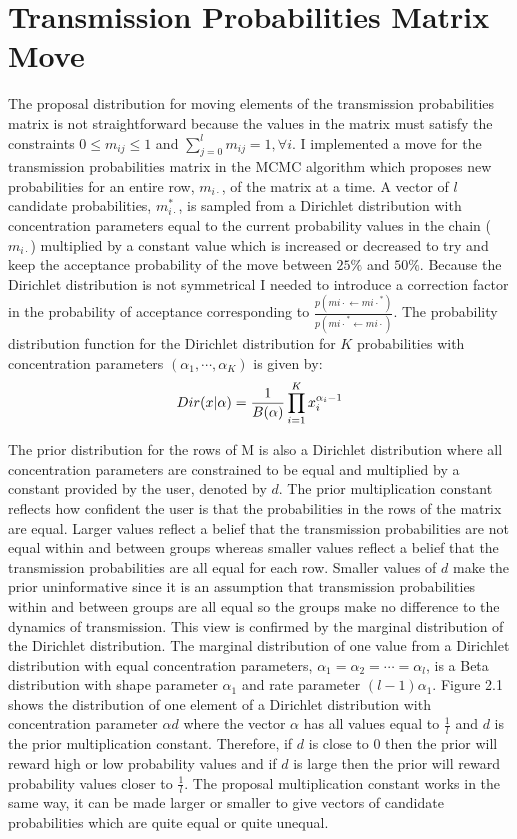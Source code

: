 \documentclass[11pt,a4paper]{report}
\begin{document}
\section{Transmission Probabilities Matrix Move}
The proposal distribution for moving elements of the transmission probabilities matrix is not straightforward because the values in the matrix must satisfy the constraints $0 \leq m_{ij} \leq 1$ and $\sum^{l}_{j=0} m_{ij} = 1, \forall i$. I implemented a move for the transmission probabilities matrix in the MCMC algorithm which proposes new probabilities for an entire row, $m_{i \cdot}$, of the matrix at a time. A vector of $l$ candidate probabilities, $m_{i \cdot}^{*}$, is sampled from a Dirichlet distribution with concentration parameters equal to the current probability values in the chain ($m_{i \cdot}$) multiplied by a constant value which is increased or decreased to try and keep the acceptance probability of the move between $25\%$ and $50\%$. Because the Dirichlet distribution is not symmetrical I needed to introduce a correction factor in the probability of acceptance corresponding to $\frac{p(m{i \cdot}\leftarrow m{i \cdot}^*)}{p(m{i \cdot}^* \leftarrow m{i \cdot})}$. The probability distribution function for the Dirichlet distribution for $K$ probabilities with concentration parameters $(\alpha_1,\cdots,\alpha_K)$ is given by:
\begin{equation}
Dir(x|\alpha) = \frac{1}{B( {\bf \alpha} )}\prod_{i=1}^{K} x_{i}^{\alpha_{i} - 1}
\end{equation}

The prior distribution for the rows of M is also a Dirichlet distribution where all concentration parameters are constrained to be equal and multiplied by a constant provided by the user, denoted by $d$. The prior multiplication constant reflects how confident the user is that the probabilities in the rows of the matrix are equal. Larger values reflect a belief that the transmission probabilities are not equal within and between groups whereas smaller values reflect a belief that the transmission probabilities are all equal for each row. Smaller values of $d$ make the prior uninformative since it is an assumption that transmission probabilities within and between groups are all equal so the groups make no difference to the dynamics of transmission. This view is confirmed by the marginal distribution of the Dirichlet distribution. The marginal distribution of one value from a Dirichlet distribution with equal concentration parameters, $\alpha_1 = \alpha_2 = \cdots = \alpha_l$, is a Beta distribution with shape parameter $\alpha_1$ and rate parameter $(l-1)\alpha_1$. Figure 2.1 shows the distribution of one element of a Dirichlet distribution with concentration parameter $\alpha d$ where the vector $\alpha$ has all values equal to $\frac{1}{l}$ and $d$ is the prior multiplication constant. Therefore, if $d$ is close to 0 then the prior will reward high or low probability values and if $d$ is large then the prior will reward probability values closer to $\frac{1}{l}$. The proposal multiplication constant works in the same way, it can be made larger or smaller to give vectors of candidate probabilities which are quite equal or quite unequal.
\end{document}
